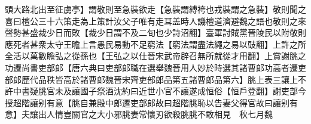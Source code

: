 頭大路北出至征虜亭】謂敬則至急裝欲走【急裝謂縛袴也戎裝謂之急裝】敬則聞之喜曰檀公三十六策走為上策計汝父子唯有走耳盖時人譏檀道濟避魏之語也敬則之來聲勢甚盛裁少日而敗【裁少日謂不及二旬也少詩沼翻】臺軍討賊黨晉陵民以附敬則應死者甚衆太守王瞻上言愚民易動不足窮法【窮法謂盡法繩之易以豉翻】上許之所全活以萬數瞻弘之從孫也【王弘之以仕晉宋武帝辟召無所就從才用翻】上賞謝脁之功遷尚書吏部郎【唐六典曰吏部郎職在選舉魏晉用人妙於時選其諸曹郎功高者遷吏部郎歷代品秩皆高於諸曹郎魏晉宋齊吏部郎品第五諸曹郎品第六】朓上表三讓上不許中書疑朓官未及讓國子祭酒沈約曰近世小官不讓遂成恒俗【恒戶登翻】謝吏部今授超階讓别有意【朓自兼殿中郎遷吏部郎故曰超階朓恥以告妻父得官故曰讓别有意】夫讓出人情豈關官之大小邪朓妻常懷刃欲殺朓朓不敢相見　秋七月魏